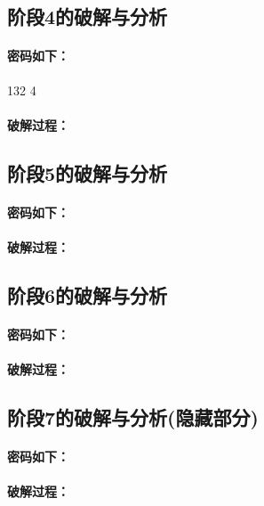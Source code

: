 \subsection{阶段4的破解与分析}

\paragraph{密码如下：}132 4

\paragraph{破解过程：}

\subsection{阶段5的破解与分析}

\paragraph{密码如下：}

\paragraph{破解过程：}

\subsection{阶段6的破解与分析}

\paragraph{密码如下：}

\paragraph{破解过程：}

\subsection{阶段7的破解与分析(隐藏部分)}

\paragraph{密码如下：}

\paragraph{破解过程：}
